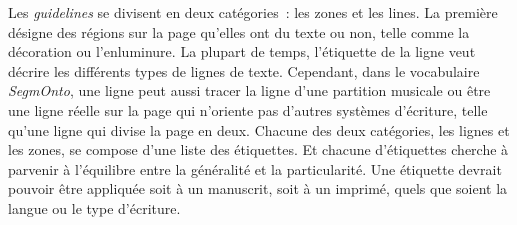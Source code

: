 \documentclass[class=article, crop=false]{standalone}
\begin{document}
Les \textit{guidelines} se divisent en deux catégories~: les \og{}zones\fg{} et les \og{}lines\fg{}. La première désigne des régions sur la page qu'elles ont du texte ou non, telle comme la décoration ou l'enluminure. La plupart de temps, l'étiquette de la ligne veut décrire les différents types de lignes de texte. Cependant, dans le vocabulaire \textit{SegmOnto}, une ligne peut aussi tracer la ligne d'une partition musicale ou être une ligne réelle sur la page qui n'oriente pas d’autres systèmes d'écriture, telle qu'une ligne qui divise la page en deux. Chacune des deux catégories, les lignes et les zones, se compose d'une liste des étiquettes. Et chacune d'étiquettes cherche à parvenir à l'équilibre entre la généralité et la particularité. Une étiquette devrait pouvoir être appliquée soit à un manuscrit, soit à un imprimé, quels que soient la langue ou le type d'écriture.
\end{document}

